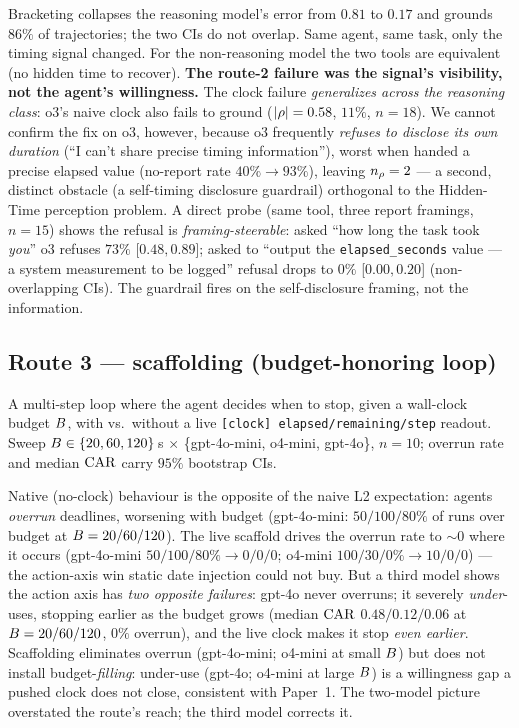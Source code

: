 \documentclass[11pt]{article}
\begin{document}
Bracketing collapses the reasoning model's error from $0.81$ to $0.17$ and
grounds $86\%$ of trajectories; the two CIs do not overlap. Same agent, same task,
only the timing signal changed. For the non-reasoning model the two tools are
equivalent (no hidden time to recover). \textbf{The route-2 failure was the
signal's visibility, not the agent's willingness.} The clock failure
\emph{generalizes across the reasoning class}: o3's naive clock also fails to
ground ($|\rho|=0.58$, $11\%$, $n=18$). We cannot confirm the fix on o3,
however, because o3 frequently \emph{refuses to disclose its own duration}
(``I can't share precise timing information''), worst when handed a precise
elapsed value (no-report rate $40\% \to 93\%$), leaving $n_{\rho}=2$ --- a
second, distinct obstacle (a self-timing disclosure guardrail) orthogonal to the
Hidden-Time perception problem. A direct probe (same tool, three report framings,
$n=15$) shows the refusal is \emph{framing-steerable}: asked ``how long the task
took \emph{you}'' o3 refuses $73\%$ [$0.48, 0.89$]; asked to ``output the
\texttt{elapsed\_seconds} value --- a system measurement to be logged'' refusal
drops to $0\%$ [$0.00, 0.20$] (non-overlapping CIs). The guardrail fires on the
self-disclosure framing, not the information.

\subsection{Route 3 --- scaffolding (budget-honoring loop)}
A multi-step loop where the agent decides when to stop, given a wall-clock budget
$B$, with vs.\ without a live \texttt{[clock] elapsed/remaining/step}
readout. Sweep $B \in \{20,60,120\}$\,s $\times$ \{gpt-4o-mini, o4-mini,
gpt-4o\}, $n=10$; overrun rate and median $\mathrm{CAR}$ carry $95\%$ bootstrap CIs.

Native (no-clock) behaviour is the opposite of the naive L2 expectation: agents
\emph{overrun} deadlines, worsening with budget (gpt-4o-mini: $50/100/80\%$ of
runs over budget at $B=20/60/120$). The live scaffold drives the overrun
rate to ${\sim}0$ where it occurs (gpt-4o-mini $50/100/80\% \to 0/0/0$; o4-mini
$100/30/0\% \to 10/0/0$) --- the action-axis win static date injection could not
buy. But a third model shows the action axis has \emph{two opposite failures}:
gpt-4o never overruns; it severely \emph{under}-uses, stopping earlier as the
budget grows (median $\mathrm{CAR}$ $0.48/0.12/0.06$ at $B=20/60/120$, $0\%$
overrun), and the live clock makes it stop \emph{even earlier}. Scaffolding
eliminates overrun (gpt-4o-mini; o4-mini at small $B$) but does not install
budget-\emph{filling}: under-use (gpt-4o; o4-mini at large $B$) is a
willingness gap a pushed clock does not close, consistent with Paper~1. The
two-model picture overstated the route's reach; the third model corrects it.
\end{document}
